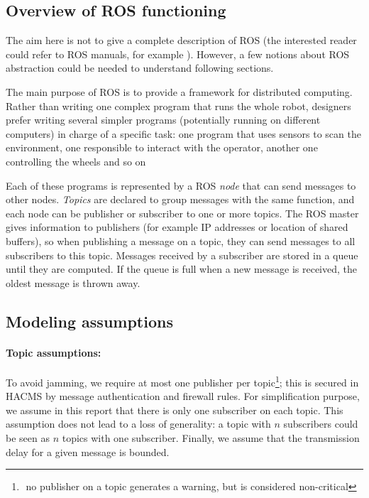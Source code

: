 \subsection{Overview of ROS functioning}

The aim here is not to give a complete description of ROS (the interested reader could refer to ROS manuals, for example \cite{O'Kane201310}). However, a few notions about ROS abstraction could be needed to understand following sections.

The main purpose of ROS is to provide a framework for distributed computing. Rather than writing one complex program that runs the whole robot, designers prefer writing several simpler programs (potentially running on different computers) in charge of a specific task: 
one program that uses sensors to scan the environment, one responsible to interact with the operator, another one controlling the wheels and so on

Each of these programs is represented by a ROS \textit{node} that can send messages to other nodes.
\textit{Topics} are declared to group messages with the same function, and each node can be publisher or subscriber to one or more topics. 
The ROS master gives information to publishers (for example IP addresses or location of shared buffers), so when publishing a message on a topic, they can send messages to all subscribers to this topic.
Messages received by a subscriber are stored in a queue until they are computed. If the queue is full when a new message is received, the oldest message is thrown away. 



\subsection{Modeling assumptions}\label{ROSarch} 

\paragraph{Topic assumptions:}
To avoid jamming, we require at most one publisher per topic\footnote{$ $ no publisher on a topic generates a warning, but is considered non-critical}; this is secured in HACMS by message authentication and firewall rules.
For simplification purpose, we assume in this report that there is only one subscriber on each topic.
This assumption does not lead to a loss of generality: a topic with $n$ subscribers could be seen as $n$ topics with one subscriber.
Finally, we assume that the transmission delay for a given message is bounded.

